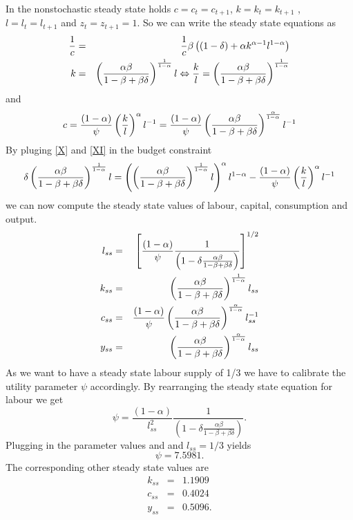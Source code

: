 \documentclass[a4paper,12pt]{article}
\begin{document}
In the nonstochastic steady state holds $c=c_{t}=c_{t+1}$, $k=k_{t}=k_{t+1}$%
, $l=l_{t}=l_{t+1}$ and $z_{t}=z_{t+1}=1$. So we can write the steady state
equations as  
\begin{eqnarray}
\frac{1}{c} &=&\frac{1}{c}\beta \left( \left( 1-\delta \right) +\alpha
k^{\alpha -1}l^{1-\alpha }\right)   \notag \\
k &=&\left( \frac{\alpha \beta }{1-\beta +\beta \delta }\right) ^{\frac{1}{%
1-\alpha }}l\Leftrightarrow \frac{k}{l}=\left( \frac{\alpha \beta }{1-\beta
+\beta \delta }\right) ^{\frac{1}{1-\alpha }}  \label{X}
\end{eqnarray}%
and 
\begin{equation}
c=\frac{\left( 1-\alpha \right) }{\psi }\left( \frac{k}{l}\right) ^{\alpha
}l^{-1}=\frac{\left( 1-\alpha \right) }{\psi }\left( \frac{\alpha \beta }{%
1-\beta +\beta \delta }\right) ^{\frac{\alpha }{1-\alpha }}l^{-1}  \label{XI}
\end{equation}%
By pluging \ref{X} and \ref{XI} in the budget constraint 
\begin{equation*}
\delta \left( \frac{\alpha \beta }{1-\beta +\beta \delta }\right) ^{\frac{1}{%
1-\alpha }}l=\left( \left( \frac{\alpha \beta }{1-\beta +\beta \delta }%
\right) ^{\frac{1}{1-\alpha }}l\right) ^{\alpha }l^{1-\alpha }-\frac{\left(
1-\alpha \right) }{\psi }\left( \frac{k}{l}\right) ^{\alpha }l^{-1}
\end{equation*}%
we can now compute the steady state values of labour, capital, consumption
and output.%
\begin{eqnarray*}
l_{ss} &=&\left[ \frac{\left( 1-\alpha \right) }{\psi }\frac{1}{\left(
1-\delta \frac{\alpha \beta }{1-\beta +\beta \delta }\right) }\right] ^{1/2}
\\
k_{ss} &=&\left( \frac{\alpha \beta }{1-\beta +\beta \delta }\right) ^{\frac{%
1}{1-\alpha }}l_{ss} \\
c_{ss} &=&\frac{\left( 1-\alpha \right) }{\psi }\left( \frac{\alpha \beta }{%
1-\beta +\beta \delta }\right) ^{\frac{\alpha }{1-\alpha }}l_{ss}^{-1} \\
y_{ss} &=&\left( \frac{\alpha \beta }{1-\beta +\beta \delta }\right) ^{\frac{%
\alpha }{1-\alpha }}l_{ss}
\end{eqnarray*}
As we want to have a steady state labour supply of 1/3 we have to calibrate
the utility parameter $\psi $ accordingly. By rearranging the steady state
equation for labour we get%
\begin{equation*}
\psi =\frac{\left( 1-\alpha \right) }{l_{ss}^{2}}\frac{1}{\left( 1-\delta 
\frac{\alpha \beta }{1-\beta +\beta \delta }\right) }.
\end{equation*}%
Plugging in the parameter values and and $l_{ss}=1/3$ yields 
\begin{equation*}
\psi =7.5981.
\end{equation*}%
The corresponding other steady state values are 
\begin{eqnarray*}
k_{ss} &=&1.1909 \\
c_{ss} &=&0.4024 \\
y_{ss} &=&0.5096.
\end{eqnarray*}
\end{document}
